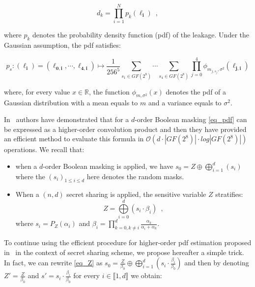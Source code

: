\documentclass{llncs}
\begin{document}
\begin{equation*}
d_k= \prod\limits_{i=1}^{N} p_{k}(\boldsymbol{\ell_i}) \enspace,
\end{equation*}    
 
where $p_k$ denotes the probability density function (pdf) of the leakage. Under the Gaussian assumption, the pdf satisfies:   

\begin{equation}
p_s : (\boldsymbol{\ell_i}) = (\boldsymbol{\ell_{0,i}}, \cdots, \boldsymbol{\ell_{4,i}}) \mapsto \frac{1}{256^5} \sum_{s_1 \in GF(2^8)} \cdots \sum_{s_4 \in GF(2^8)} \prod\limits_{j=0}^{4} \phi_{m_{j,s_j}, \sigma^2} (\boldsymbol{\ell_{j,i}})
\label{eq_pdf}
\end{equation} 
 
where, for every value $x \in \mathbb{R}$, the function $\phi_{m,\sigma^2}(x)$ denotes the pdf of a Gaussian distribution with a mean equals to $m$ and a variance equals to $\sigma^2$. 

In~\cite{LPRRT14} authors have demonstrated that for a $d$\myth-order Boolean masking \eqref{eq_pdf} can be expressed as a higher-order convolution product and then they have provided an efficient method to evaluate this formula in $ \mathcal{O}(d \cdot |GF(2^8)| \cdot log|GF(2^8)|)$ operations. 
We recall that:
\begin{itemize}
\item  when a $d$\myth-order Boolean masking is applied, we have $s_0= Z \oplus \bigoplus\limits_{i=1}^{d} (s_i)$ where the $(s_i)_{1 \le i \le d}$ here denotes the random masks.

\item When a $(n,d)$ secret sharing is applied, the sensitive variable $Z$ stratifies: 
\begin{equation}
Z=\bigoplus\limits_{i=0}^{d} (s_i \cdot \beta_i) \enspace,
\label{eq_Z}
\end{equation}
 where $s_i =P_Z(\alpha_i)$ and $\beta_i=\prod\limits_{k=0,k\neq i}^{d} \frac{\alpha_k}{\alpha_i+\alpha_k}$. 
\end{itemize}

To continue using the efficient procedure for higher-order pdf estimation proposed in~\cite{LPRRT14} in the context of secret sharing scheme, we propose hereafter a simple trick. In fact, we can rewrite \eqref{eq_Z} as $s_0=\frac{Z}{\beta_0}\oplus\bigoplus\limits_{i=1}^{d} (s_i \cdot \frac{\beta_i}{\beta_0})$ and then by denoting $Z'=\frac{Z}{\beta_0}$ and $s'=s_i \cdot \frac{\beta_i}{\beta_0}$ for every $i \in \llbracket 1, d\rrbracket$ we obtain:
\end{document}
